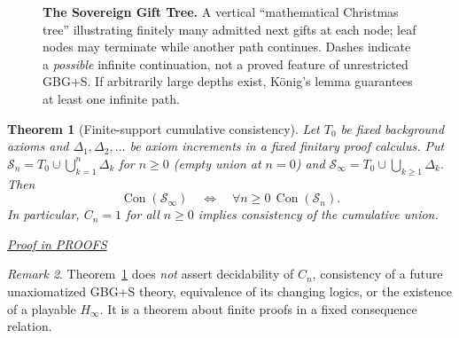 \documentclass[11pt,letterpaper]{article}
\newtheorem{theorem}{Theorem}[section]
\theoremstyle{definition}\newtheorem{definition}[theorem]{Definition}\newtheorem{example}[theorem]{Example}
\theoremstyle{remark}\newtheorem{remark}[theorem]{Remark}
\newcommand{\Con}{\operatorname{Con}}
\newcommand{\Stage}{\mathcal{S}}
\newcommand{\proofat}[1]{\par\smallskip\noindent\hfill\textit{\hyperref[#1]{Proof in PROOFS}}}
\begin{document}
\begin{figure}[htbp]
\centering
{}
\caption{\textbf{The Sovereign Gift Tree.} A vertical ``mathematical Christmas tree'' illustrating finitely many admitted next gifts at each node; leaf nodes may terminate while another path continues. Dashes indicate a \emph{possible} infinite continuation, not a proved feature of unrestricted GBG+S. If arbitrarily large depths exist, K\"onig's lemma guarantees at least one infinite path.}
\label{w0:fig:gift-tree}
\end{figure}


\begin{theorem}[Finite-support cumulative consistency]\label{w0:thm:finite}
Let $T_0$ be fixed background axioms and $\Delta_1,\Delta_2,\ldots$ be axiom increments in a fixed finitary proof calculus. Put $\Stage_n=T_0\cup\bigcup_{k=1}^n\Delta_k$ for $n\ge0$ (empty union at $n=0$) and $\Stage_\infty=T_0\cup\bigcup_{k\ge1}\Delta_k$. Then
\[
\Con(\Stage_\infty)\quad\Longleftrightarrow\quad\forall n\ge0\,\Con(\Stage_n).
\]
In particular, $C_n=1$ for all $n\ge0$ implies consistency of the cumulative union.\proofat{w0:pr:finite}
\end{theorem}
\begin{remark}
Theorem~\ref{w0:thm:finite} does \emph{not} assert decidability of $C_n$, consistency of a future unaxiomatized GBG+S theory, equivalence of its changing logics, or the existence of a playable $H_\infty$. It is a theorem about finite proofs in a fixed consequence relation.
\end{remark}
\end{document}
